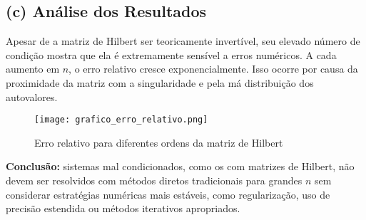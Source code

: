 \documentclass[12pt]{article}
\begin{document}
\subsection*{(c) Análise dos Resultados}

Apesar de a matriz de Hilbert ser teoricamente invertível, seu elevado número de condição mostra que ela é extremamente sensível a erros numéricos. A cada aumento em $n$, o erro relativo cresce exponencialmente. Isso ocorre por causa da proximidade da matriz com a singularidade e pela má distribuição dos autovalores.

\begin{figure}[H]
    \centering
    \texttt{[image: grafico\_erro\_relativo.png]}
    \caption{Erro relativo para diferentes ordens da matriz de Hilbert}
\end{figure}

\textbf{Conclusão:} sistemas mal condicionados, como os com matrizes de Hilbert, não devem ser resolvidos com métodos diretos tradicionais para grandes $n$ sem considerar estratégias numéricas mais estáveis, como regularização, uso de precisão estendida ou métodos iterativos apropriados.
\end{document}

